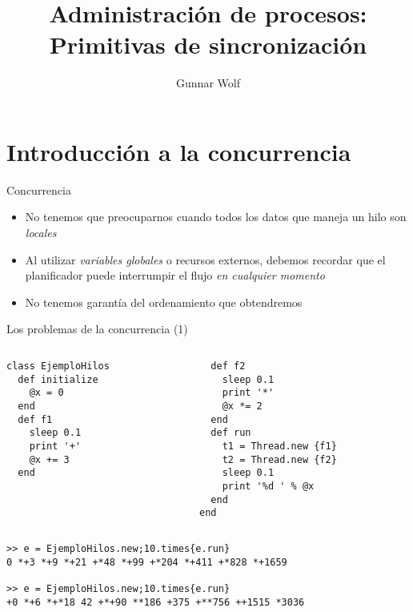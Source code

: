 \documentclass[presentation]{beamer}
\author{Gunnar Wolf}
\date{}
\title{Administración de procesos: Primitivas de sincronización}
\begin{document}
\maketitle

\section{Introducción a la concurrencia}
\label{sec:org5a4b4e0}
\begin{frame}[label={sec:org15d6579}]{Concurrencia}
\begin{itemize}
\item No tenemos que preocuparnos cuando todos los datos que maneja un
hilo son \emph{locales}
\item Al utilizar \emph{variables globales} o recursos externos, debemos
recordar que el planificador puede interrumpir el flujo \emph{en
cualquier momento}
\item No tenemos garantía del ordenamiento que obtendremos
\end{itemize}
\end{frame}

\begin{frame}[label={sec:orge87bd98},fragile]{Los problemas de la concurrencia (1)}
 \begin{columns}\begin{column}{0.5\textwidth}
\begin{verbatim}
class EjemploHilos
  def initialize
    @x = 0
  end
  def f1
    sleep 0.1
    print '+'
    @x += 3
  end
\end{verbatim}
\end{column} \begin{column}{0.5\textwidth}
\begin{verbatim}
  def f2
    sleep 0.1
    print '*'
    @x *= 2
  end
  def run
    t1 = Thread.new {f1}
    t2 = Thread.new {f2}
    sleep 0.1
    print '%d ' % @x
  end
end
\end{verbatim}
\end{column}\end{columns}\pause
\begin{verbatim}
>> e = EjemploHilos.new;10.times{e.run}
0 *+3 *+9 *+21 +*48 *+99 +*204 *+411 +*828 *+1659

>> e = EjemploHilos.new;10.times{e.run}
+0 *+6 *+*18 42 +*+90 **186 +375 +**756 ++1515 *3036
\end{verbatim}
\end{frame}
\end{document}
